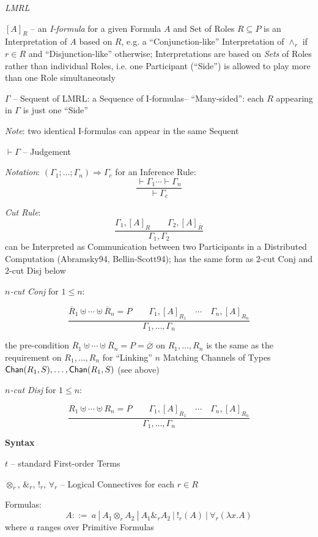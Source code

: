 \emph{LMRL}

$[A]_R$ -- an \emph{I-formula} for a given Formula $A$ and Set of
Roles $R \subseteq P$ is an Interpretation of $A$ based on $R$, e.g. a
``Conjunction-like'' Interpretation of $\wedge_r$ if $r \in R$ and
``Disjunction-like'' otherwise; Interpretations are based on
\emph{Sets} of Roles rather than individual Roles, i.e. one
Participant (``Side'') is allowed to play more than one Role
simultaneously

$\Gamma$ -- Sequent of LMRL: a Sequence of I-formulas--
``Many-sided'': each $R$ appearing in $\Gamma$ is just one ``Side''

\fist \emph{Note}: two identical I-formulas can appear in the same
Sequent

$\vdash \Gamma$ -- Judgement

\fist \emph{Notation}: $(\Gamma_1;\ldots;\Gamma_n) \Rightarrow
\Gamma_c$ for an Inference Rule:
\[
  \frac{\vdash \Gamma_1 \cdots \vdash \Gamma_n}{\vdash \Gamma_c}
\]

\emph{Cut Rule}:
\[
  \frac{
    \Gamma_1,[A]_R \quad\quad \Gamma_2,[A]_{\overline{R}}
  }{
    \Gamma_1,\Gamma_2
  }
\]
can be Interpreted as Communication between two Participants in a
Distributed Computation (Abramsky94, Bellin-Scott94); has the same
form as $2$-cut Conj and $2$-cut Disj below


\emph{$n$-cut Conj} for $1 \leq n$:

\[
  \frac{
    \overline{R}_1 \uplus \cdots \uplus \overline{R}_n = P \quad\quad
      \Gamma_1,[A]_{R_1} \quad \cdots \quad \Gamma_n,[A]_{R_n}
  }{
    \Gamma_1, \ldots, \Gamma_n
  }
\]

the pre-condition $\overline{R}_1 \uplus \cdots \uplus \overline{R}_n
= P = \overline{\varnothing}$ on $R_1, \ldots, R_n$ is the same as the
requirement on $R_1, \ldots, R_n$ for ``Linking'' $n$ Matching
Channels of Types $\mathsf{Chan}(R_1,S), \ldots, \mathsf{Chan}(R_1,S)$ (see above)


\emph{$n$-cut Disj} for $1 \leq n$:

\[
  \frac{
    R_1 \uplus \cdots \uplus R_n = P \quad\quad
      \Gamma_1,[A]_{R_1} \quad \cdots \quad \Gamma_n,[A]_{R_n}
  }{
    \Gamma_1, \ldots, \Gamma_n
  }
\]


\textbf{Syntax}

$t$ -- standard First-order Terms

$\otimes_r$, $\&_r$, $!_r$, $\forall_r$ -- Logical Connectives for
each $r \in R$

Formulas:
\[
  A ::=\ a \ |\ A_1 \otimes_r A_2 \ |\ A_1 \&_r A_2 \ |\ !_r(A)
    \ |\ \forall_r(\lambda x.A)
\]
where $a$ ranges over Primitive Formulas

